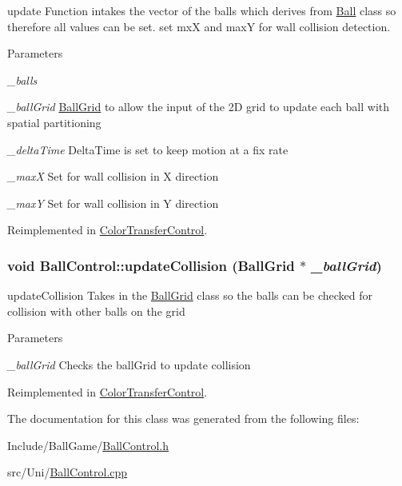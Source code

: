 update Function intakes the vector of the balls which derives from \hyperlink{structBall}{Ball} class so therefore all values can be set. set mxX and maxY for wall collision detection. 
\begin{DoxyParams}{Parameters}
\item[{\em \_\-balls}]\item[{\em \_\-ballGrid}]\hyperlink{classBallGrid}{BallGrid} to allow the input of the 2D grid to update each ball with spatial partitioning \item[{\em \_\-deltaTime}]DeltaTime is set to keep motion at a fix rate \item[{\em \_\-maxX}]Set for wall collision in X direction \item[{\em \_\-maxY}]Set for wall collision in Y direction \end{DoxyParams}


Reimplemented in \hyperlink{classColorTransferControl_add37c8ee8e911a13ecec98cf09fc81c4}{ColorTransferControl}.\hypertarget{classBallControl_a352ac9ed1ddedb11892e92ea75e1d171}{
\subsubsection[{updateCollision}]{\setlength{\rightskip}{0pt plus 5cm}void BallControl::updateCollision ({\bf BallGrid} $\ast$ {\em \_\-ballGrid})}}
\label{classBallControl_a352ac9ed1ddedb11892e92ea75e1d171}


updateCollision Takes in the \hyperlink{classBallGrid}{BallGrid} class so the balls can be checked for collision with other balls on the grid 
\begin{DoxyParams}{Parameters}
\item[{\em \_\-ballGrid}]Checks the ballGrid to update collision \end{DoxyParams}


Reimplemented in \hyperlink{classColorTransferControl_a9f54f20a18940cf66c08a994eb8dfb01}{ColorTransferControl}.

The documentation for this class was generated from the following files:\begin{DoxyCompactItemize}
\item 
Include/BallGame/\hyperlink{BallControl_8h}{BallControl.h}\item 
src/Uni/\hyperlink{BallControl_8cpp}{BallControl.cpp}\end{DoxyCompactItemize}
